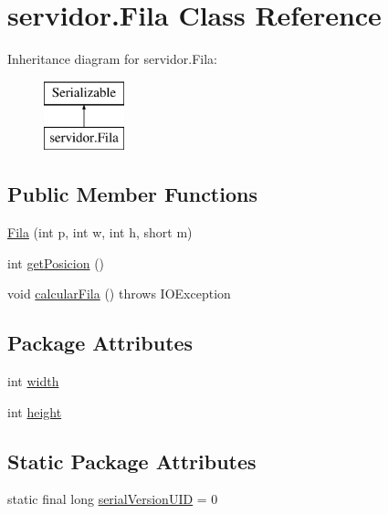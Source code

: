 \hypertarget{classservidor_1_1Fila}{}\section{servidor.\+Fila Class Reference}
\label{classservidor_1_1Fila}
Inheritance diagram for servidor.\+Fila\+:\begin{figure}[H]
\begin{center}
\leavevmode
\includegraphics[height=2.000000cm]{classservidor_1_1Fila}
\end{center}
\end{figure}
\subsection*{Public Member Functions}
\begin{DoxyCompactItemize}
\item 
\hyperlink{classservidor_1_1Fila_ae55455a4bb3011452ee3bd9b07487b28}{Fila} (int p, int w, int h, short m)
\item 
int \hyperlink{classservidor_1_1Fila_ae0ac6d6fdbe9ce5563e6b4c44e4ac8cb}{get\+Posicion} ()
\item 
void \hyperlink{classservidor_1_1Fila_aef9662ce8e314d5300741c593a9d7623}{calcular\+Fila} ()  throws I\+O\+Exception 
\end{DoxyCompactItemize}
\subsection*{Package Attributes}
\begin{DoxyCompactItemize}
\item 
int \hyperlink{classservidor_1_1Fila_a5d6c08f920ba4ef0fc26ace09ff0ead1}{width}
\item 
int \hyperlink{classservidor_1_1Fila_aab3edb5ec7dc0d0df4d4bf89a49aa72f}{height}
\end{DoxyCompactItemize}
\subsection*{Static Package Attributes}
\begin{DoxyCompactItemize}
\item 
static final long \hyperlink{classservidor_1_1Fila_a14a142adc5c71e953428bbcaa8d82ea6}{serial\+Version\+U\+ID} = 0
\end{DoxyCompactItemize}
